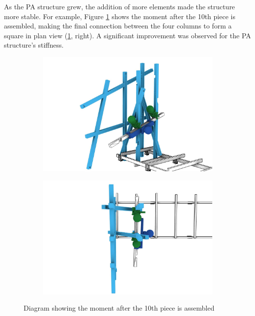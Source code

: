 \FloatBarrier

As the PA structure grew, the addition of more elements made the structure more stable. For example, Figure \ref{fig:more-stable-moments} shows the moment after the 10th piece is assembled, making the final connection between the four columns to form a square in plan view (\ref{fig:more-stable-moments}, right). A significant improvement was observed for the PA structure’s stiffness. 

\begin{figure}[!h]
    \centering
    \begin{subfigure}[b]{0.49\textwidth}
        \centering
        \includegraphics[width=\textwidth]{images/05/image48.jpg}
    \end{subfigure}
    \hfill
    \begin{subfigure}[b]{0.49\textwidth}
        \centering
        \includegraphics[width=\textwidth]{images/05/image65.jpg}
    \end{subfigure}
    \caption{Diagram showing the moment after the 10th piece is assembled}
    \label{fig:more-stable-moments}
\end{figure}

